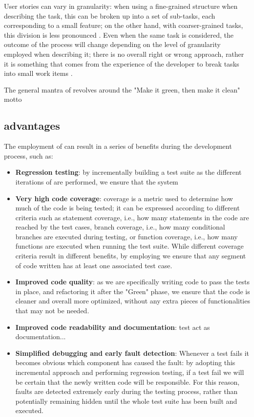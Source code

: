 User stories can vary in granularity: when using a fine-grained structure when describing the task, this can be broken up into a set of sub-tasks, each corresponding to a small feature; on the other hand, with coarser-grained tasks, this division is less pronounced \cite{DBLP:journals/tse/KaracTJ21}. Even when the same task is considered, the outcome of the \tdd process will change depending on the level of granularity employed when describing it; there is no overall right or wrong approach, rather it is something that comes from the experience of the developer to break tasks into small work items \cite{DBLP:journals/tse/KaracTJ21}.

The general mantra of \tdd revolves around the "Make it green, then make it clean" motto

\subsection{\tdd advantages}
The employment of \tdd can result in a series of benefits during the development process, such as:
\begin{itemize}
    \item \textbf{Regression testing}: by incrementally building a test suite as the different iterations of \tdd are performed, we ensure that the system  
    \item \textbf{Very high code coverage}: coverage is a metric used to determine how much of the code is being tested; it can be expressed according to different criteria such as statement coverage, i.e., how many statements in the code are reached by the test cases, branch coverage, i.e., how many conditional branches are executed during testing, or function coverage, i.e., how many functions are executed when running the test suite. While different coverage criteria result in different benefits, by employing \tdd we ensure that any segment of code written has at least one associated test case.
    \item \textbf{Improved code quality}: as we are specifically writing code to pass the tests in place, and refactoring it after the "Green" phase, we ensure that the code is cleaner and overall more optimized, without any extra pieces of functionalities that may not be needed. 
    \item \textbf{Improved code readability and documentation}: test act as documentation...
    \item \textbf{Simplified debugging and early fault detection}: Whenever a test fails it becomes obvious which component has caused the fault: by adopting this incremental approach and performing regression testing, if a test fail we will be certain that the newly written code will be responsible. For this reason, faults are detected extremely early during the testing process, rather than potentially remaining hidden until the whole test suite has been built and executed.
\end{itemize}


